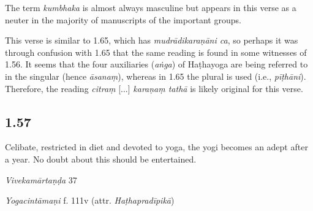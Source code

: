 \begin{ekdosis}
\begin{philcomm}[hp01_056]
The term \emph{kumbhaka} is almost always masculine but appears in this verse as a neuter in the majority of manuscripts of the important groups.


This verse is similar to 1.65, which has \emph{mudrādikaraṇāni ca}, so perhaps it was through confusion with 1.65 that the same reading is found in some witnesses of 1.56. It seems that the four auxiliaries (\emph{aṅga}) of Haṭhayoga are being referred to in the singular (hence \emph{āsanaṃ}), whereas in 1.65 the plural is used (i.e., \emph{pīṭhāni}). Therefore, the reading \emph{citraṃ} [...] \emph{karaṇaṃ tathā} is likely original for this verse.

%
\end{philcomm}

\subsection*{1.57}
\begin{translation}[hp01_057]
Celibate, restricted in diet and devoted to yoga, the yogi becomes an adept after a year. No doubt about this should be entertained.
\end{translation}

\begin{sources}[hp01_057]
\emph{Vivekamārtaṇḍa} 37

\begin{versinnote}
\end{versinnote}

\end{sources}

\begin{testimonia}[hp01_057]
\emph{Yogacintāmaṇi} f. 111v (attr. \emph{Haṭhapradīpikā})

\begin{versinnote}
\end{versinnote}


\end{testimonia}
\end{ekdosis}

